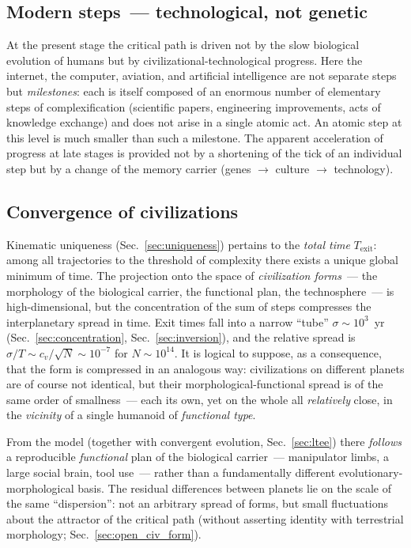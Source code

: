 \documentclass[11pt,a4paper]{article}
\begin{document}
\subsection{Modern steps~--- technological, not genetic}
\label{sec:modern_steps}

At the present stage the critical path is driven not by the slow biological evolution of humans but by civilizational-technological progress. Here the internet, the computer, aviation, and artificial intelligence are not separate steps but \emph{milestones}: each is itself composed of an enormous number of elementary steps of complexification (scientific papers, engineering improvements, acts of knowledge exchange) and does not arise in a single atomic act. An atomic step at this level is much smaller than such a milestone. The apparent acceleration of progress at late stages is provided not by a shortening of the tick of an individual step but by a change of the memory carrier (genes $\to$ culture $\to$ technology).

\subsection{Convergence of civilizations}
\label{sec:time_form}

Kinematic uniqueness (Sec.~\ref{sec:uniqueness}) pertains to the \emph{total time} $T_{\mathrm{exit}}$: among all trajectories to the threshold of complexity there exists a unique global minimum of time. The projection onto the space of \emph{civilization forms}~--- the morphology of the biological carrier, the functional plan, the technosphere~--- is high-dimensional, but the concentration of the sum of steps compresses the interplanetary spread in time. Exit times fall into a narrow ``tube'' $\sigma \sim 10^3$~yr (Sec.~\ref{sec:concentration}, Sec.~\ref{sec:inversion}), and the relative spread is $\sigma/T \sim c_v/\sqrt{N} \sim 10^{-7}$ for $N \sim 10^{14}$. It is logical to suppose, as a consequence, that the form is compressed in an analogous way: civilizations on different planets are of course not identical, but their morphological-functional spread is of the same order of smallness~--- each its own, yet on the whole all \emph{relatively} close, in the \emph{vicinity} of a single humanoid of \emph{functional type}.

From the model (together with convergent evolution, Sec.~\ref{sec:ltee}) there \emph{follows} a reproducible \emph{functional} plan of the biological carrier~--- manipulator limbs, a large social brain, tool use~--- rather than a fundamentally different evolutionary-morphological basis. The residual differences between planets lie on the scale of the same ``dispersion'': not an arbitrary spread of forms, but small fluctuations about the attractor of the critical path (without asserting identity with terrestrial morphology; Sec.~\ref{sec:open_civ_form}).
\end{document}

